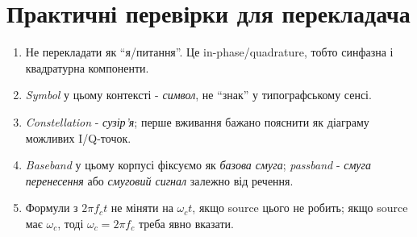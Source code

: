 \section{Практичні перевірки для перекладача}

\begin{enumerate}[label=\arabic*.]
\item Не перекладати  як ``я/питання''. Це in-phase/quadrature, тобто синфазна і квадратурна компоненти.
\item \textit{Symbol} у цьому контексті - \emph{символ}, не ``знак'' у типографському сенсі.
\item \textit{Constellation} - \emph{сузір'я}; перше вживання бажано пояснити як діаграму можливих I/Q-точок.
\item \textit{Baseband} у цьому корпусі фіксуємо як \emph{базова смуга}; \textit{passband} - \emph{смуга перенесення} або \emph{смуговий сигнал} залежно від речення.
\item Формули з $2\pi f_c t$ не міняти на $\omega_c t$, якщо source цього не робить; якщо source має $\omega_c$, тоді $\omega_c=2\pi f_c$ треба явно вказати.
\end{enumerate}
